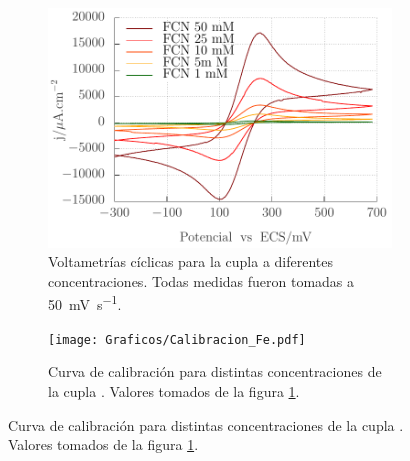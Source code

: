 {			\begin{figure}[ht]
	 	    	\begin{subfigure}[t]{0.5\textwidth}
	         	\includegraphics[width=\textwidth]{Graficos/Concentraciones_Fe.pdf}
	        	\caption{Voltametrías cíclicas para la cupla \fe\space a diferentes concentraciones. Todas medidas fueron tomadas a \SI{50}{\milli\volt\per\second}.}
	         	\label{fig:Fe_a}
	     		\end{subfigure}
     		 \begin{subfigure}[t]{0.495\textwidth}
	        	\texttt{[image: Graficos/Calibracion\_Fe.pdf]}
	       		\caption{Curva de calibración para distintas concentraciones de la cupla \fe. Valores tomados de la figura \ref{fig:Fe_a}.}
	         	\label{fig:Fe_b}
	     		\end{subfigure}


\end{figure}}
